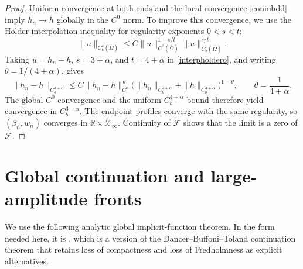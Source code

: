 \documentclass[12pt,letterpaper]{amsart}
\numberwithin{equation}{section}
\def\R{{\mathbb R}}
\begin{document}
\begin{proof}
	{Uniform convergence at both ends and the local convergence \eqref{coninbdd} imply $h_n\to h$ globally in the $C^0$ norm. To improve this convergence, we use the H\"older interpolation inequality for regularity exponents $0<s<t$:}
	\begin{equation}
		\label{interpholdero}
\|u\|_{C_b^s(\overline\Omega)}\leq C\|u\|_{C^0(\overline\Omega)}^{1-s/t}\|u\|^{s/t}_{C_b^t(\overline\Omega)}.
	\end{equation}
{Taking $u=h_n-h$, $s=3+\alpha$, and $t=4+\alpha$ in \eqref{interpholdero}, and writing $\theta=1/(4+\alpha)$, gives}
\begin{equation*}
	 \|h_n-h\|_{C_b^{3+\alpha}}
 \le C\|h_n-h\|_{C^0}^{\,\theta}
       \bigl(\|h_n\|_{C_b^{4+\alpha}}
             +\|h\|_{C_b^{4+\alpha}}\bigr)^{1-\theta},
 \qquad \theta=\frac1{4+\alpha},
\end{equation*}
{The global $C^0$ convergence and the uniform $C_b^{4+\alpha}$ bound therefore yield convergence in $C_b^{3+\alpha}$. The endpoint profiles converge with the same regularity, so $(\beta_n,w_n)$ converges in $\R\times\mathscr X_\infty$. Continuity of $\mathcal F$ shows that the limit is a zero of $\mathcal F$.}
\end{proof}

	
	
	
	
	
	
	
	\section{{Global continuation and large-amplitude fronts}}\label{sec:global-continuation}
	We use the following analytic global implicit-function theorem.  In the form
needed here, it is \cite[Theorem~B.1]{ChenWalshWheelerFronts}, which is a version
of the Dancer--Buffoni--Toland continuation theorem \cite{BuffoniToland} that retains loss of
compactness and loss of Fredholmness as explicit alternatives.
\end{document}
